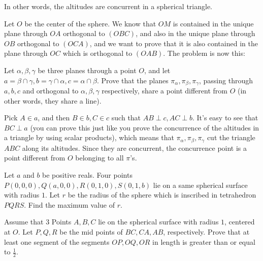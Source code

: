 \documentclass[12pt,a4paper]{memoir}
\theoremstyle{definition}
\begin{document}
\begin{solution}[name={Solution by Grobber}] 
	In other words, the altitudes are concurrent in a spherical triangle.
	
	Let $O$ be the center of the sphere. We know that $OM$ is contained in the unique plane through $OA$ orthogonal to $(OBC)$, and also in the unique plane through $OB$ orthogonal to $(OCA)$, and we want to prove that it is also contained in the plane through $OC$ which is orthogonal to $(OAB)$. The problem is now this:
	
	Let $\alpha,\beta,\gamma$ be three planes through a point $O$, and let $a=\beta\cap\gamma,b=\gamma\cap\alpha,c=\alpha\cap\beta$. Prove that the planes $\pi_\alpha,\pi_\beta,\pi_\gamma$, passing through $a,b,c$ and orthogonal to $\alpha,\beta,\gamma$ respectively, share a point different from $O$ (in other words, they share a line).
	
	Pick $A\in a$, and then $B\in b,C\in c$ such that $AB\perp c,AC\perp b$. It's easy to see that $BC\perp a$ (you can prove this just like you prove the concurrence of the altitudes in a triangle by using scalar products), which means that $\pi_\alpha,\pi_\beta,\pi_\gamma$ cut the triangle $ABC$ along its altitudes. Since they are concurrent, the concurrence point is a point different from $O$ belonging to all $\pi$'s.
\end{solution}





\begin{question}[name={1992 Tokyo University Entrance Exam}]
	Let $a$ and $b$ be positive reals. Four points $P(0,0,0),Q(a,0,0),R(0,1,0),S(0,1,b)$ lie on a same spherical surface with radius $1$. Let $r$ be the radius of the sphere which is inscribed in tetrahedron $PQRS$. Find the maximum value of $r$.
\end{question}



\begin{question}[name={1993 Kyoto University Entrance Exam}]
	Assume that $3$ Points $A,B,C$ lie on the spherical surface with radius $1$, centered at $O$. Let $P,Q,R$ be the mid points of $BC,CA,AB$, respectively. Prove that at least one segment of the segments $OP,OQ,OR$ in length is greater than or equal to $\frac{1}{2}$.
\end{question}
\end{document}
